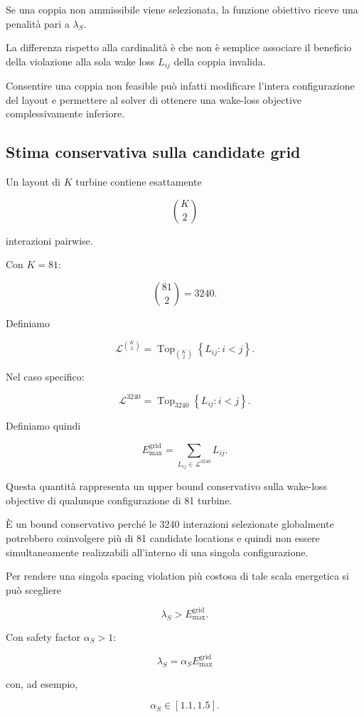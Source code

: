 \documentclass[11pt,a4paper]{report}
\begin{document}
Se una coppia non ammissibile viene selezionata, la funzione obiettivo
riceve una penalità pari a $\lambda_S$.

La differenza rispetto alla cardinalità è che non è semplice associare il
beneficio della violazione alla sola wake loss $L_{ij}$ della coppia
invalida.

Consentire una coppia non feasible può infatti modificare l'intera
configurazione del layout e permettere al solver di ottenere una
wake-loss objective complessivamente inferiore.

\subsection{Stima conservativa sulla candidate grid}

Un layout di $K$ turbine contiene esattamente

\[
\binom{K}{2}
\]

interazioni pairwise.

Con $K=81$:

\[
\binom{81}{2}=3240.
\]

Definiamo

\[
\mathcal L^{\binom{K}{2}}
=
\operatorname{Top}_{\binom{K}{2}}
\left\{
L_{ij}:i<j
\right\}.
\]

Nel caso specifico:

\[
\mathcal L^{3240}
=
\operatorname{Top}_{3240}
\left\{
L_{ij}:i<j
\right\}.
\]

Definiamo quindi

\[
E_{\max}^{\mathrm{grid}}
=
\sum_{L_{ij}\in\mathcal L^{3240}}
L_{ij}.
\]

Questa quantità rappresenta un upper bound conservativo sulla wake-loss
objective di qualunque configurazione di 81 turbine.

È un bound conservativo perché le 3240 interazioni selezionate
globalmente potrebbero coinvolgere più di 81 candidate locations e quindi
non essere simultaneamente realizzabili all'interno di una singola
configurazione.

Per rendere una singola spacing violation più costosa di tale scala
energetica si può scegliere

\[
\lambda_S
>
E_{\max}^{\mathrm{grid}}.
\]

Con safety factor $\alpha_S>1$:

\[
\boxed{
\lambda_S
=
\alpha_S
E_{\max}^{\mathrm{grid}}
}
\]

con, ad esempio,

\[
\alpha_S\in[1.1,1.5].
\]
\end{document}
